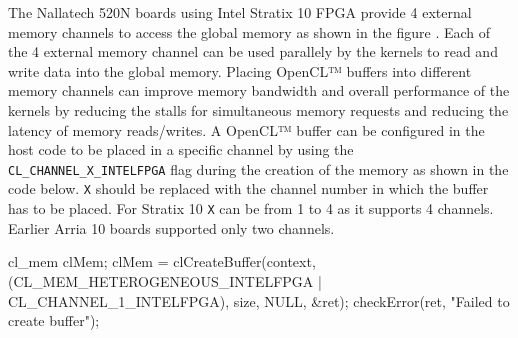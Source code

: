 The Nallatech 520N boards using Intel Stratix 10 FPGA provide 4 external memory channels
to access the global memory as shown in the figure . Each of the
4 external memory channel can be used parallely by the kernels to read and write data
into the global memory. Placing OpenCL™ buffers into different memory channels can
improve memory bandwidth and overall performance of the kernels by reducing the stalls
for simultaneous memory requests and reducing the latency of memory reads/writes.
A OpenCL™ buffer can be configured in the host code to be placed in a specific channel
by using the \texttt{CL\_CHANNEL\_X\_INTELFPGA} flag during the creation of the memory
as shown in the code below. \texttt{X} should be replaced with the channel number in which
the buffer has to be placed. For Stratix 10 \texttt{X} can be from 1 to 4 as it supports 4 channels.
Earlier Arria 10 boards supported only two channels.
\begin{CppCode}
cl_mem clMem;
clMem = clCreateBuffer(context, (CL_MEM_HETEROGENEOUS_INTELFPGA | CL_CHANNEL_1_INTELFPGA), size, NULL, &ret);
checkError(ret, "Failed to create buffer");
\end{CppCode}

